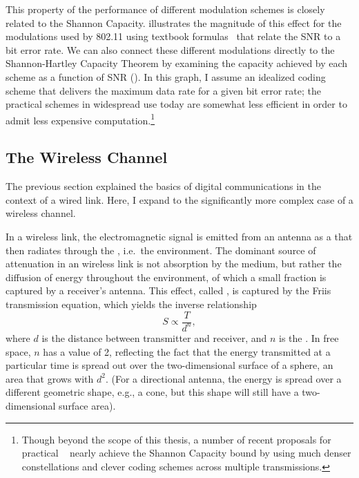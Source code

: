 This property of the performance of different modulation schemes is closely related to the Shannon Capacity.  illustrates the magnitude of this effect for the modulations used by 802.11 using textbook formulas~\cite{Sklar} that relate the SNR to a bit error rate. We can also connect these different modulations directly to the Shannon-Hartley Capacity Theorem by examining the capacity achieved by each scheme as a function of SNR (). In this graph, I assume an idealized coding scheme that delivers the maximum data rate for a given bit error rate; the practical schemes in widespread use today are somewhat less efficient in order to admit less expensive computation.\footnote{Though beyond the scope of this thesis, a number of recent proposals for practical ~\cite{Gudipati_Strider,Perry_Spinal} nearly achieve the Shannon Capacity bound by using much denser constellations and clever coding schemes across multiple transmissions.}

\subsection{The Wireless Channel}
The previous section explained the basics of digital communications in the context of a wired link. Here, I expand to the significantly more complex case of a wireless channel.

In a wireless link, the electromagnetic signal is emitted from an antenna as a  that then radiates through the , i.e.\ the environment. The dominant source of attenuation in an wireless link is not absorption by the medium, but rather the diffusion of energy throughout the environment, of which a small fraction is captured by a receiver's antenna. This effect, called , is captured by the Friis transmission equation, which yields the inverse relationship
\begin{equation}
\label{eq:friis}
	S \propto \frac{T}{d^n},
\end{equation}
where $d$ is the distance between transmitter and receiver, and $n$ is the . In free space, $n$ has a value of 2, reflecting the fact that the energy transmitted at a particular time is spread out over the two-dimensional surface of a sphere, an area that grows with $d^2$. (For a directional antenna, the energy is spread over a different geometric shape, e.g., a cone, but this shape will still have a two-dimensional surface area).

